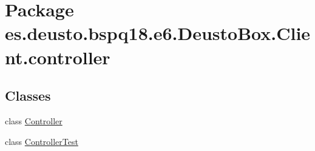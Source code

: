 \hypertarget{namespacees_1_1deusto_1_1bspq18_1_1e6_1_1_deusto_box_1_1_client_1_1controller}{}\section{Package es.\+deusto.\+bspq18.\+e6.\+Deusto\+Box.\+Client.\+controller}
\label{namespacees_1_1deusto_1_1bspq18_1_1e6_1_1_deusto_box_1_1_client_1_1controller}
\subsection*{Classes}
\begin{DoxyCompactItemize}
\item 
class \mbox{\hyperlink{classes_1_1deusto_1_1bspq18_1_1e6_1_1_deusto_box_1_1_client_1_1controller_1_1_controller}{Controller}}
\item 
class \mbox{\hyperlink{classes_1_1deusto_1_1bspq18_1_1e6_1_1_deusto_box_1_1_client_1_1controller_1_1_controller_test}{Controller\+Test}}
\end{DoxyCompactItemize}
